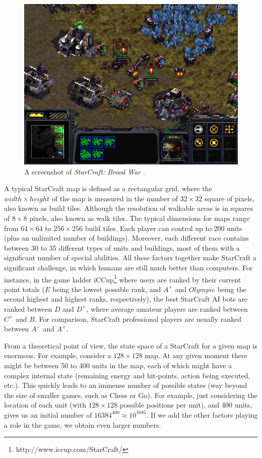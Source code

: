 \documentclass[journal]{IEEEtran}
\begin{document}
\begin{figure}
    \centering
    \includegraphics[width=0.8\columnwidth]{figures/starcraft1.png}
    \caption{A screenshot of \emph{StarCraft: Brood War}%
    .}
    \label{fig:StarCraft}
\end{figure}

A typical StarCraft map is defined as a rectangular grid, where the $width \times height$ of the map is measured in the number of $32 \times 32$ square of pixels, also known as build tiles. Although the
resolution of walkable areas is in squares of $8 \times 8$ pixels, also known as walk tiles. The typical dimensions for maps range from $64 \times 64$ to $256 \times 256$ build tiles. Each player  can
control up  to 200 units (plus an unlimited number of buildings).  Moreover, each
different race  contains between 30  to 35 different types  of units
and  buildings,  most of them with  a significant  number  of  special
abilities. All these factors  together make StarCraft a significant
challenge,   in   which   humans    are   still   much   better   than
computers. For instance, in the game ladder iCCup\footnote{http://www.iccup.com/StarCraft/} where users are ranked by their current point totals ($E$ being the lowest possible rank, and $A^+$ and $Olympic$ being the second highest and highest ranks, respectively), the best StarCraft AI bots are ranked between $D$ and $D^+$, where average  amateur players are  ranked between $C^+$ and  $B$. For comparison, StarCraft professional  players are usually ranked between
$A^-$ and $A^+$.

From a theoretical point of view, the state space of a StarCraft for a given map is enormous. For example, consider a $128 \times 128$ map. At any given moment there might be between 50 to 400 units in the map, each of which might have a complex internal state (remaining energy and hit-points, action being executed, etc.). This quickly leads to an immense number of possible states (way beyond the size of smaller games, such as Chess or Go). For example, just considering the location of each unit (with $128 \times 128$ possible positions per unit), and 400 units, gives us an initial number of $16384^{400} \approx 10^{1685}$. If we add the other factors playing a role in the game, we obtain even larger numbers. 
\end{document}
